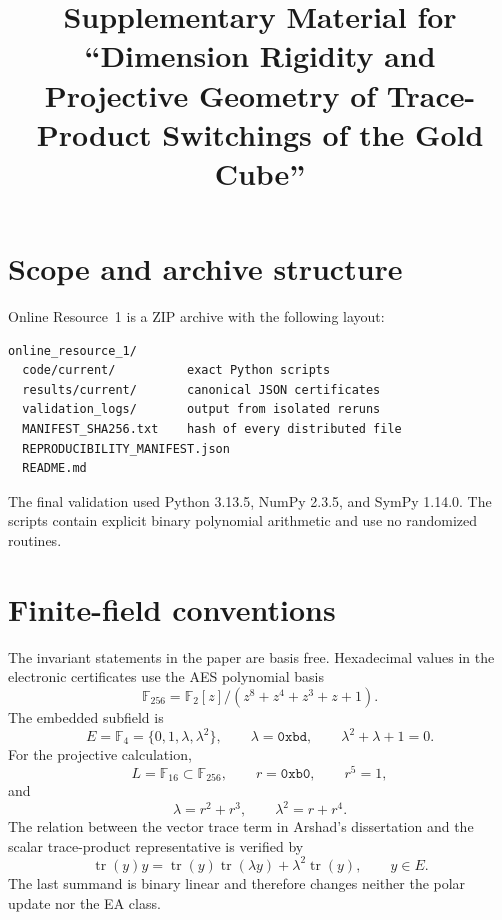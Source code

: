 \documentclass[pdflatex,sn-mathphys-num]{sn-jnl}
\newcommand{\F}{\mathbb F}
\newcommand{\tr}{\operatorname{tr}}
\begin{document}
\title[Supplementary material]{Supplementary Material for ``Dimension Rigidity and Projective Geometry of Trace-Product Switchings of the Gold Cube''}
\author*[1,2]{ }
\maketitle

\section{Scope and archive structure}

Online Resource~1 is a ZIP archive with the following layout:
\begin{verbatim}
online_resource_1/
  code/current/          exact Python scripts
  results/current/       canonical JSON certificates
  validation_logs/       output from isolated reruns
  MANIFEST_SHA256.txt    hash of every distributed file
  REPRODUCIBILITY_MANIFEST.json
  README.md
\end{verbatim}
The final validation used Python 3.13.5, NumPy 2.3.5, and SymPy 1.14.0.  The scripts contain explicit binary polynomial arithmetic and use no randomized routines.

\section{Finite-field conventions}

The invariant statements in the paper are basis free.  Hexadecimal values in the electronic certificates use the AES polynomial basis
\[
 \F_{256}=\F_2[z]/(z^8+z^4+z^3+z+1).
\]
The embedded subfield is
\[
 E=\F_4=\{0,1,\lambda,\lambda^2\},
 \qquad \lambda=\texttt{0xbd},
 \qquad \lambda^2+\lambda+1=0.
\]
For the projective calculation,
\[
 L=\F_{16}\subset\F_{256},\qquad r=\texttt{0xb0},\qquad r^5=1,
\]
and
\[
 \lambda=r^2+r^3,
 \qquad \lambda^2=r+r^4.
\]
The relation between the vector trace term in Arshad's dissertation and the scalar trace-product representative is verified by
\[
 \tr(y)y=\tr(y)\tr(\lambda y)+\lambda^2\tr(y),\qquad y\in E.
\]
The last summand is binary linear and therefore changes neither the polar update nor the EA class.
\end{document}
